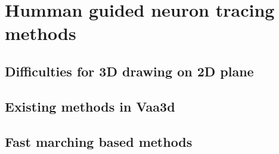 \chapter{Humman guided neuron tracing methods} \label{chpt:manual-nt}
\section{Difficulties for 3D drawing on 2D plane}
\section{Existing methods in Vaa3d}
\section{Fast marching based methods}
